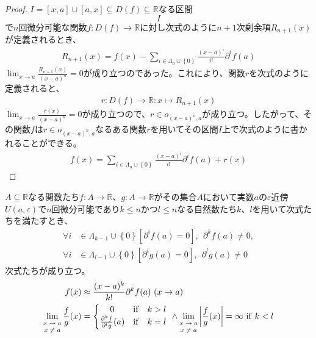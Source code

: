 \documentclass[dvipdfmx]{jsarticle}
\begin{document}
\begin{proof}
$I=[x,a]\cup[a,x]\subseteq D(f)\subseteq\mathbb{R}$なる区間$$I$$で$n$回微分可能な関数$f:D(f)\rightarrow \mathbb{R} $に対し次式のように$n+1$次剰余項$R_{n+1} (x)$が定義されるとき、
\begin{align*}
R_{n + 1}(x) = f(x) - \sum_{i \in \varLambda_{n} \cup \left\{ 0 \right\}} {\frac{(x - a)^{i}}{i!}\partial^{i}f(a)}
\end{align*}
$\lim_{x \rightarrow a}\frac{R_{n + 1}(x)}{(x - a)^{n}} = 0$が成り立つのであった。これにより、関数$r$を次式のように定義されると、
\begin{align*}
r:D(f) \rightarrow \mathbb{R}:x \mapsto R_{n + 1}(x)
\end{align*}
$\lim_{x \rightarrow a}\frac{r(x)}{(x - a)^{n}} = 0$が成り立つので、$r \in o_{(x - a)^{n},a}$が成り立つ。したがって、その関数$f$は$r \in o_{(x - a)^{n},a}$なるある関数$r$を用いてその区間$I$上で次式のように書かれることができる。
\begin{align*}
f(x) = \sum_{i \in \varLambda_{n} \cup \left\{ 0 \right\}} {\frac{(x - a)^{i}}{i!}\partial^{i}f(a)} + r(x)
\end{align*}
\end{proof}
\begin{thm}\label{4.2.4.4}
$A \subseteq \mathbb{R}$なる関数たち$f:A \rightarrow \mathbb{R}$、$g:A \rightarrow \mathbb{R}$がその集合$A$において実数$a$の$\varepsilon$近傍$U(a,\varepsilon)$で$n$回微分可能であり$k \leq n$かつ$l \leq n$なる自然数たち$k$、$l$を用いて次式たちを満たすとき、
\begin{align*}
\forall i &\in \varLambda_{k - 1} \cup \left\{ 0 \right\}\left[ \partial^{i}f(a) = 0 \right],\ \ \partial^{k}f(a) \neq 0,\\
\forall i &\in \varLambda_{l - 1} \cup \left\{ 0 \right\}\left[ \partial^{i}g(a) = 0 \right],\ \ \partial^{l}g(a) \neq 0
\end{align*}
次式たちが成り立つ。
\begin{align*}
f(x) &\approx \frac{(x - a)^{k}}{k!}\partial^{k}f(a)\ (x \rightarrow a)\\
\lim_{\scriptsize \begin{matrix}
x \rightarrow a \\
x \neq a \\
\end{matrix}}{\frac{f}{g}(x)} &= \left\{ \begin{matrix}
0 & \mathrm{if} & k > l \\
\frac{\partial^{k}f}{\partial^{l}g}(a) & \mathrm{if} & k = l \\
\end{matrix} \right.\  \land \lim_{\scriptsize \begin{matrix}
x \rightarrow a \\
x \neq a \\
\end{matrix}}\left| \frac{f}{g}(x) \right| = \infty\ \mathrm{if}\ k < l
\end{align*}
\end{thm}
\end{document}
